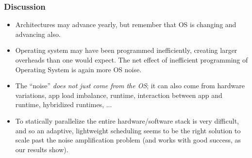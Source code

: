 \begin{frame}[Discussion]
\frametitle{Discussion} 
\begin{itemize}
\item \small Architectures may advance yearly, but remember that OS is changing and advancing also.
\item \small Operating system may have been programmed 
inefficiently, creating larger overheads than 
one would expect. The net effect of inefficient
programming of Operating System is again more OS noise. 
\item \small  The ``noise'' \textit{does not just come from the OS}; it 
can also come from hardware variations, app load imbalance, runtime, 
interaction between app and runtime, hybridized runtimes, ... \\  
\item \small To statically parallelize the entire
hardware/software stack is very difficult, and so an adaptive, lightweight scheduling
seems to be the right solution to scale past the noise amplification problem
(and works with good success, as our results show). 
\end{itemize}
\end{frame}  



